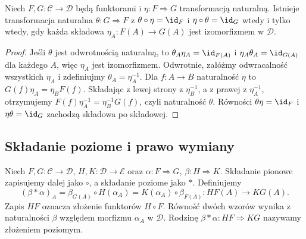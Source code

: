 \begin{stwierdzenie}\label{tw:nat-iso-components}
Niech $F,G:\mathcal C\to\mathcal D$ będą funktorami i $\eta:F\Rightarrow G$ transformacją naturalną. Istnieje transformacja naturalna $\theta:G\Rightarrow F$ z $\theta\circ\eta=\id_F$ i $\eta\circ\theta=\id_G$ wtedy i tylko wtedy, gdy każda składowa $\eta_A:F(A)\to G(A)$ jest izomorfizmem w $\mathcal D$.
\end{stwierdzenie}
\begin{proof}
Jeśli $\theta$ jest odwrotnością naturalną, to $\theta_A\eta_A=\id_{F(A)}$ i $\eta_A\theta_A=\id_{G(A)}$ dla każdego $A$, więc $\eta_A$ jest izomorfizmem. Odwrotnie, załóżmy odwracalność wszystkich $\eta_A$ i zdefiniujmy $\theta_A=\eta_A^{-1}$. Dla $f:A\to B$ naturalność $\eta$ to $G(f)\eta_A=\eta_BF(f)$. Składając z lewej strony z $\eta_B^{-1}$, a z prawej z $\eta_A^{-1}$, otrzymujemy $F(f)\eta_A^{-1}=\eta_B^{-1}G(f)$, czyli naturalność $\theta$. Równości $\theta\eta=\id_F$ i $\eta\theta=\id_G$ zachodzą składowa po składowej.
\end{proof}

\subsection{Składanie poziome i prawo wymiany}

\begin{definicja}\label{cat:def:horizontal}
Niech $F,G:\mathcal C\to\mathcal D$, $H,K:\mathcal D\to\mathcal E$ oraz $\alpha:F\Rightarrow G$, $\beta:H\Rightarrow K$. Składanie pionowe zapisujemy dalej jako $\circ$, a składanie poziome jako $\ast$. Definiujemy
\[
(\beta\ast\alpha)_A=\beta_{G(A)}\circ H(\alpha_A)
=K(\alpha_A)\circ\beta_{F(A)}:HF(A)\to KG(A).
\]
Zapis $HF$ oznacza złożenie funktorów $H\circ F$. Równość dwóch wzorów wynika z naturalności $\beta$ względem morfizmu $\alpha_A$ w $\mathcal D$. Rodzinę $\beta\ast\alpha:HF\Rightarrow KG$ nazywamy złożeniem poziomym.
\end{definicja}

